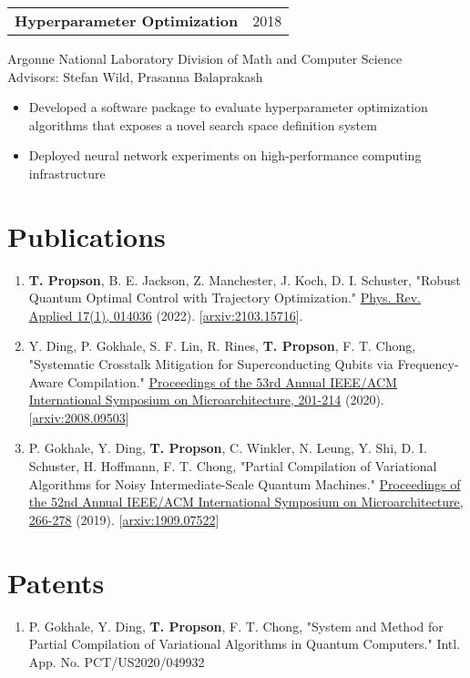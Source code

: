\documentclass[letterpaper, 11pt]{article}
\begin{document}
\begin{tabular}{@{} L{12cm} @{} R{4.51cm} @{}}
  \textbf{Hyperparameter Optimization} & 2018\\
\end{tabular}
Argonne National Laboratory Division of Math and Computer Science\\
Advisors: Stefan Wild, Prasanna Balaprakash
\begin{itemize}
\item Developed a software package to evaluate hyperparameter optimization algorithms
  that exposes a novel search space definition system
  \item Deployed neural network experiments on high-performance computing infrastructure 
\end{itemize}

\section{Publications}
\begin{enumerate}
\item \textbf{T. Propson}, B. E. Jackson, Z. Manchester, J. Koch, D. I. Schuster, "Robust Quantum
  Optimal Control with Trajectory Optimization."
  \href{https://journals.aps.org/prapplied/abstract/10.1103/PhysRevApplied.17.014036}{
    Phys. Rev. Applied 17(1), 014036} (2022).
  [\href{https://arxiv.org/abs/2103.15716}{arxiv:2103.15716}].
\item Y. Ding, P. Gokhale, S. F. Lin, R. Rines, \textbf{T. Propson}, F. T. Chong,
  "Systematic Crosstalk Mitigation for Superconducting Qubits via Frequency-Aware Compilation."
  \href{https://ieeexplore.ieee.org/document/9251858}{Proceedings of the 53rd Annual
  IEEE/ACM International Symposium on Microarchitecture, 201-214} (2020).
       [\href{https://arxiv.org/abs/2008.09503}{arxiv:2008.09503}]
\item P. Gokhale, Y. Ding, \textbf{T. Propson}, C. Winkler, N. Leung, Y. Shi,
  D. I. Schuster, H. Hoffmann, F. T. Chong,
  "Partial Compilation of Variational Algorithms for Noisy Intermediate-Scale Quantum Machines."
  \href{https://doi.org/10.1145/3352460.3358313}{Proceedings of the 52nd Annual
    IEEE/ACM International Symposium on Microarchitecture, 266-278} (2019).
       [\href{https://arxiv.org/abs/1909.07522}{arxiv:1909.07522}]
\end{enumerate}

\section{Patents}
\begin{enumerate}
  \item P. Gokhale, Y. Ding, \textbf{T. Propson}, F. T. Chong, "System and Method
    for Partial Compilation of Variational Algorithms in Quantum Computers." Intl. App. No. PCT/US2020/049932
\end{enumerate}
\end{document}
